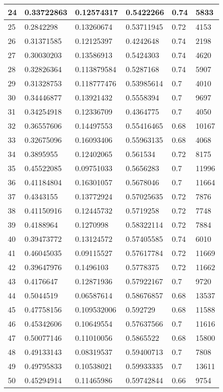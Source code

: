 \begin{longtable}{|l|l|l|l|l|l|}
24 & 0.33722863 & 0.12574317 & 0.5422266 & 0.74 & 5833 \\ \hline 
25 & 0.2842298 & 0.13260674 & 0.53711945 & 0.72 & 4153 \\ \hline 
26 & 0.31371585 & 0.12125397 & 0.4242648 & 0.74 & 2198 \\ \hline 
27 & 0.30030203 & 0.13586913 & 0.5424303 & 0.74 & 4620 \\ \hline 
28 & 0.32826364 & 0.113879584 & 0.5287168 & 0.74 & 5907 \\ \hline 
29 & 0.31328753 & 0.118777476 & 0.53985614 & 0.7 & 4010 \\ \hline 
30 & 0.34446877 & 0.13921432 & 0.5558394 & 0.7 & 9697 \\ \hline 
31 & 0.34254918 & 0.12336709 & 0.4364775 & 0.7 & 4050 \\ \hline 
32 & 0.36557606 & 0.14497553 & 0.55416465 & 0.68 & 10167 \\ \hline 
33 & 0.32675096 & 0.16093406 & 0.55963135 & 0.68 & 4068 \\ \hline 
34 & 0.3895955 & 0.12402065 & 0.561534 & 0.72 & 8175 \\ \hline 
35 & 0.45522085 & 0.09751033 & 0.5656283 & 0.7 & 11996 \\ \hline 
36 & 0.41184804 & 0.16301057 & 0.5678046 & 0.7 & 11664 \\ \hline 
37 & 0.4343155 & 0.13772924 & 0.57025635 & 0.72 & 7876 \\ \hline 
38 & 0.41150916 & 0.12445732 & 0.5719258 & 0.72 & 7748 \\ \hline 
39 & 0.4188964 & 0.1270998 & 0.58322114 & 0.72 & 7884 \\ \hline 
40 & 0.39473772 & 0.13124572 & 0.57405585 & 0.74 & 6010 \\ \hline 
41 & 0.46045035 & 0.09115527 & 0.57617784 & 0.72 & 11669 \\ \hline 
42 & 0.39647976 & 0.1496103 & 0.5778375 & 0.72 & 11662 \\ \hline 
43 & 0.4176647 & 0.12871936 & 0.57922167 & 0.7 & 9720 \\ \hline 
44 & 0.5044519 & 0.06587614 & 0.58676857 & 0.68 & 13537 \\ \hline 
45 & 0.47758156 & 0.109532006 & 0.592729 & 0.68 & 11588 \\ \hline 
46 & 0.45342606 & 0.10649554 & 0.57637566 & 0.7 & 11616 \\ \hline 
47 & 0.50077146 & 0.11010056 & 0.5865522 & 0.68 & 15800 \\ \hline 
48 & 0.49133143 & 0.08319537 & 0.59400713 & 0.7 & 7808 \\ \hline 
49 & 0.49795833 & 0.10538021 & 0.59933335 & 0.7 & 13611 \\ \hline 
50 & 0.45294914 & 0.11465986 & 0.59742844 & 0.66 & 9754 \\ \hline 
\end{longtable}
